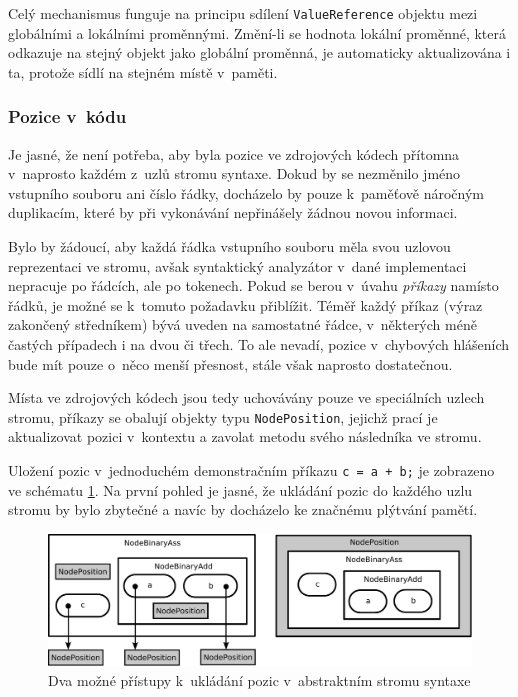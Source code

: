 \documentclass[11pt,twoside,a4paper]{book}
\begin{document}
Celý mechanismus funguje na principu sdílení \texttt{ValueReference} objektu mezi globálními a lo\-kál\-ní\-mi proměnnými. Změní-li se hodnota lokální proměnné, která odkazuje na stejný objekt jako globální proměnná, je automaticky aktualizována i ta, protože sídlí na stejném místě v~paměti.


\subsubsection{Pozice v~kódu}
\label{pozice_v_kodu}

Je jasné, že není potřeba, aby byla pozice ve zdrojových kódech přítomna v~naprosto každém z~uzlů stromu syntaxe. Dokud by se nezměnilo jméno vstupního souboru ani číslo řádky, docházelo by pouze k~paměťově náročným duplikacím, které by při vykonávání nepřinášely žádnou novou informaci.

Bylo by žádoucí, aby každá řádka vstupního souboru měla svou uzlovou reprezentaci ve stromu, avšak syntaktický analyzátor v~dané implementaci nepracuje po řádcích, ale po tokenech. Pokud se berou v~úvahu \textit{příkazy} namísto řádků, je možné se k~tomuto požadavku přiblížit. Téměř každý příkaz (výraz zakončený středníkem) bývá uveden na samostatné řádce, v~některých méně častých případech i na dvou či třech. To ale nevadí, pozice v~chybových hlášeních bude mít pouze o~něco menší přesnost, stále však naprosto dostatečnou.

Místa ve zdrojových kódech jsou tedy uchovávány pouze ve speciálních uzlech stromu, příkazy se obalují objekty typu \texttt{NodePosition}, jejichž prací je aktualizovat pozici v~kontextu a zavolat metodu svého ná\-sled\-ní\-ka ve stromu.

Uložení pozic v~jednoduchém demonstračním příkazu \texttt{c = a + b;} je zobrazeno ve schématu \ref{fig:nodeposition}. Na první pohled je jasné, že ukládání pozic do každého uzlu stromu by bylo zbytečné a navíc by docházelo ke značnému plýtvání pamětí.

\begin{figure}[ht]
\begin{center}
\includegraphics[width=12cm]{img/nodeposition.pdf}
\caption{Dva možné přístupy k~ukládání pozic v~abstraktním stromu syntaxe}
\label{fig:nodeposition}
\end{center}
\end{figure}
\end{document}
